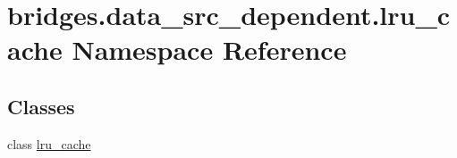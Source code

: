 \hypertarget{namespacebridges_1_1data__src__dependent_1_1lru__cache}{}\section{bridges.\+data\+\_\+src\+\_\+dependent.\+lru\+\_\+cache Namespace Reference}
\label{namespacebridges_1_1data__src__dependent_1_1lru__cache}
\subsection*{Classes}
\begin{DoxyCompactItemize}
\item 
class \hyperlink{classbridges_1_1data__src__dependent_1_1lru__cache_1_1lru__cache}{lru\+\_\+cache}
\end{DoxyCompactItemize}
